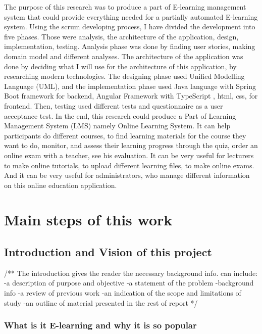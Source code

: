 \documentclass{scrartcl}
\begin{document}
The purpose of this research was to produce a  part of E-learning management system that could provide everything needed for a partially automated  E-learning system. Using the scrum developing process, I have divided the development into five phases. Those were analysis, the architecture of the application, design, implementation, testing. Analysis phase was done by finding user stories, making domain model and different analyses. The architecture of the application was done by deciding what I will use for the architecture of this application, by researching modern technologies. The designing phase used Unified Modelling Language (UML), and the implementation phase used Java language with Spring Boot framework for backend, Angular Framework with TypeScript , html, css, for frontend. Then, testing used different tests and questionnaire as a user acceptance test. In the end, this research could produce a Part of Learning Management System (LMS) namely Online Learning System. It can help participants do different courses, to find learning materials for the course they want to do, monitor, and assess their learning progress through the quiz, order an online exam with a teacher, see his evaluation. It can be very useful for lecturers to make online tutorials, to upload different learning files, to make online exams. And it can be very useful for administrators, who manage different information on this online education application.

 



\section{Main steps of this work}


\subsection{Introduction and Vision of this project}

/** The introduction gives the reader the necessary background info. can include:
-a description of purpose and objective
-a statement of the problem
-background info
-a review of previous work
-an indication of the scope and limitations of study
-an outline of material presented in the rest of report
*/ \\
  	\subsubsection{What is it E-learning and why it is so popular}
  	
\end{document}
